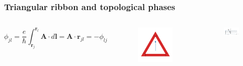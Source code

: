 \documentclass[xcolor=dvipsnames,10pt,aspectratio=169]{beamer}
\renewcommand{\vec}[1]{\mathbf{#1}}
\begin{document}
  \begin{frame}
    \frametitle{Triangular ribbon and topological phases}

    \begin{columns}
      \footnotesize
      \begin{equation*}
        \phi_{jl} = \dfrac{e}{\hbar}\int_{\vec{r}_j}^{\vec{r}_l} \vec{A} \cdot d\vec{l} = \vec{A}\cdot\vec{r}_{jl} = -\phi_{lj}
      \end{equation*}
      \vspace{-5mm}
      \begin{figure}
        \includegraphics[height=0.50\textheight]{./figures/hollow-triangle-constant-vector-potential.pdf}
      \end{figure}

      \vspace{-10mm}
      \begin{figure}
        \includegraphics[height=0.30\textheight]{./figures/triangular-lattice-finite-width-ribbon.pdf}
      \end{figure}


\end{columns}
\end{frame}
\end{document}
